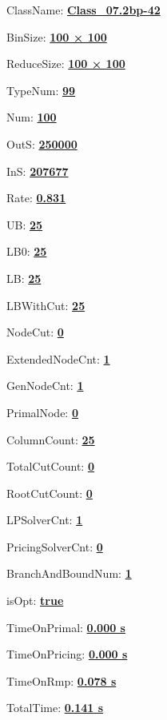 \documentclass[11pt]{article}
\begin{document}
\pagestyle{empty}


ClassName: \underline{\textbf{Class_07.2bp-42}}
\par
BinSize: \underline{\textbf{100 × 100}}
\par
ReduceSize: \underline{\textbf{100 × 100}}
\par
TypeNum: \underline{\textbf{99}}
\par
Num: \underline{\textbf{100}}
\par
OutS: \underline{\textbf{250000}}
\par
InS: \underline{\textbf{207677}}
\par
Rate: \underline{\textbf{0.831}}
\par
UB: \underline{\textbf{25}}
\par
LB0: \underline{\textbf{25}}
\par
LB: \underline{\textbf{25}}
\par
LBWithCut: \underline{\textbf{25}}
\par
NodeCut: \underline{\textbf{0}}
\par
ExtendedNodeCnt: \underline{\textbf{1}}
\par
GenNodeCnt: \underline{\textbf{1}}
\par
PrimalNode: \underline{\textbf{0}}
\par
ColumnCount: \underline{\textbf{25}}
\par
TotalCutCount: \underline{\textbf{0}}
\par
RootCutCount: \underline{\textbf{0}}
\par
LPSolverCnt: \underline{\textbf{1}}
\par
PricingSolverCnt: \underline{\textbf{0}}
\par
BranchAndBoundNum: \underline{\textbf{1}}
\par
isOpt: \underline{\textbf{true}}
\par
TimeOnPrimal: \underline{\textbf{0.000 s}}
\par
TimeOnPricing: \underline{\textbf{0.000 s}}
\par
TimeOnRmp: \underline{\textbf{0.078 s}}
\par
TotalTime: \underline{\textbf{0.141 s}}
\par
\newpage


\end{document}
